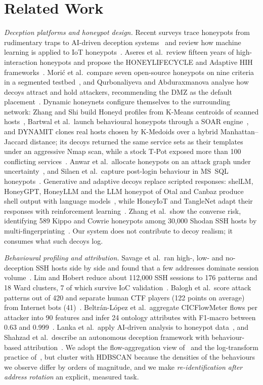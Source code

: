 \documentclass[conference]{IEEEtran}
\begin{document}
\section{Related Work}\label{sec:related}
\textit{Deception platforms and honeypot design.} Recent surveys trace honeypots from rudimentary traps to AI-driven deception systems~\cite{mahija2025,javadpour2024} and review how machine learning is applied to IoT honeypots~\cite{lanz2025}. Aseres et al.\ review fifteen years of high-interaction honeypots and propose the HONEYLIFECYCLE and Adaptive HIH frameworks~\cite{aseres2026}. Mori\'c et al.\ compare seven open-source honeypots on nine criteria in a segmented testbed~\cite{moric2025}, and Qurbonaliyeva and Abduraxmanova analyse how decoys attract and hold attackers, recommending the DMZ as the default placement~\cite{qurbonaliyeva2024}. Dynamic honeynets configure themselves to the surrounding network: Zhang and Shi build Honeyd profiles from K-Means centroids of scanned hosts~\cite{zhangshi2023}, Bartwal et al.\ launch behavioural honeypots through a SOAR engine~\cite{bartwal2022}, and DYNAMIT clones real hosts chosen by K-Medoids over a hybrid Manhattan--Jaccard distance; its decoys returned the same service sets as their templates under an aggressive Nmap scan, while a stock T-Pot exposed more than 100 conflicting services~\cite{maraden2026}. Anwar et al.\ allocate honeypots on an attack graph under uncertainty~\cite{anwar2022}, and Silaen et al.\ capture post-login behaviour in MS~SQL honeypots~\cite{silaen2025}. Generative and adaptive decoys replace scripted responses: shelLM, HoneyGPT, HoneyLLM and the LLM honeypot of Otal and Canbaz produce shell output with language models~\cite{sladic2024,wang2024,guan2024,otal2024}, while HoneyIoT and TangleNet adapt their responses with reinforcement learning~\cite{guan2023,gazdar2025}. Zhang et al.\ show the converse risk, identifying 589 Kippo and Cowrie honeypots among 30,000 Shodan SSH hosts by multi-fingerprinting~\cite{zhang2023}. Our system does not contribute to decoy realism; it consumes what such decoys log.

\textit{Behavioural profiling and attribution.} Savage et al.\ ran high-, low- and no-deception SSH hosts side by side and found that a few addresses dominate session volume~\cite{savage2025}. Lim and Hobert reduce about 112,000 SSH sessions to 176 patterns and 18 Ward clusters, 7 of which survive IoC validation~\cite{lim2026}. Balogh et al.\ score attack patterns out of 420 and separate human CTF players (122 points on average) from Internet bots (41)~\cite{balogh2025}. Beltr\'an-L\'opez et al.\ aggregate CICFlowMeter flows per attacker into 90 features and infer 24 ontology attributes with F1-macro between 0.63 and 0.999~\cite{beltran2026}. Lanka et al.\ apply AI-driven analysis to honeypot data~\cite{lanka2024}, and Shahzad et al.\ describe an autonomous deception framework with behaviour-based attribution~\cite{shahzad2026}. We adopt the flow-aggregation view of~\cite{beltran2026} and the log-transform practice of~\cite{savage2025}, but cluster with HDBSCAN because the densities of the behaviours we observe differ by orders of magnitude, and we make \emph{re-identification after address rotation} an explicit, measured task.
\end{document}
